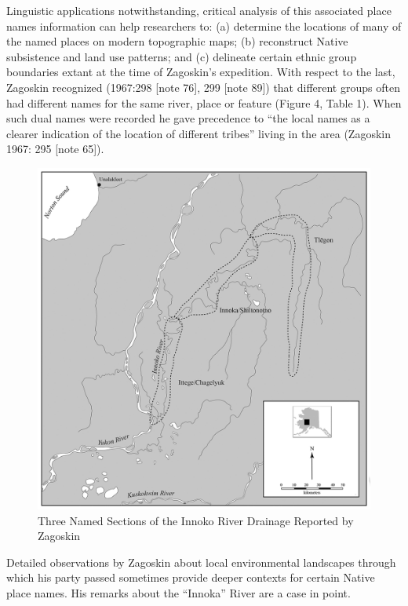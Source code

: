 Linguistic applications notwithstanding, critical analysis of this associated place names information can help researchers to: (a) determine the locations of many of the named places on modern topographic maps; (b) reconstruct Native subsistence and land use patterns; and (c) delineate certain ethnic group boundaries extant at the time of Zagoskin’s expedition. With respect to the last, Zagoskin recognized (1967:298 [note 76], 299 [note 89]) that different groups often had different names for the same river, place or feature (Figure 4, Table 1). When such dual names were recorded he gave precedence to “the local names as a clearer indication of the location of different tribes” living in the area (Zagoskin 1967: 295 [note 65]).

\begin{figure}
    \centering
    \includegraphics[scale=0.7]{figures/pratt-fig4.png}
    \caption{Three Named Sections of the Innoko River Drainage Reported by Zagoskin}
    \label{fig4}
\end{figure}

Detailed observations by Zagoskin about local environmental landscapes through which his party passed sometimes provide deeper contexts for certain Native place names. His remarks about the “Innoka” River are a case in point.


